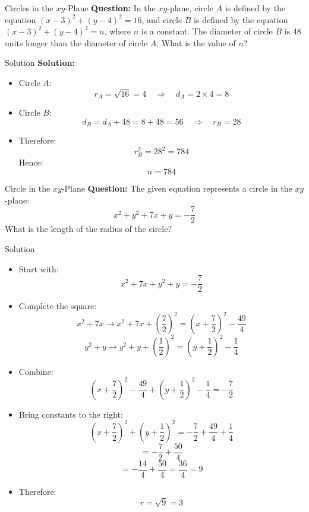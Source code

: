 \documentclass{beamer}
\begin{document}
\begin{frame}{Circles in the \(xy\)-Plane}
\textbf{Question:}  
In the \(xy\)-plane, circle \(A\) is defined by the equation \((x - 3)^2 + (y - 4)^2 = 16\), and circle \(B\) is defined by the equation \((x - 3)^2 + (y - 4)^2 = n\), where \(n\) is a constant. The diameter of circle \(B\) is 48 units longer than the diameter of circle \(A\). What is the value of \(n\)?
\end{frame}

\begin{frame}{Solution}
\textbf{Solution:}
\begin{itemize}
    \item Circle \(A\):
    \[
    r_A = \sqrt{16} = 4 \quad \Rightarrow \quad d_A = 2 \times 4 = 8
    \]
    \item Circle \(B\):
    \[
    d_B = d_A + 48 = 8 + 48 = 56 \quad \Rightarrow \quad r_B = 28
    \]
    \item Therefore:
    \[
    r_B^2 = 28^2 = 784
    \]
    Hence:
    \[
    \boxed{n = 784}
    \]
\end{itemize}
\end{frame}

\begin{frame}{Circle in the \(xy\)-Plane}
\textbf{Question:}  
The given equation represents a circle in the \(xy\)-plane:
\[
x^2 + y^2 + 7x + y = -\frac{7}{2}
\]
What is the length of the radius of the circle?
\end{frame}

\begin{frame}{Solution}
\scriptsize

\begin{itemize}
    \item Start with:
    \[
    x^2 + 7x + y^2 + y = -\frac{7}{2}
    \]
    \item Complete the square:
    \[
    x^2 + 7x \rightarrow x^2 + 7x + \left(\frac{7}{2}\right)^2 = \left(x + \frac{7}{2}\right)^2 - \frac{49}{4}
    \]
    \[
    y^2 + y \rightarrow y^2 + y + \left(\frac{1}{2}\right)^2 = \left(y + \frac{1}{2}\right)^2 - \frac{1}{4}
    \]
    \item Combine:
    \[
    \left(x + \frac{7}{2}\right)^2 - \frac{49}{4} + \left(y + \frac{1}{2}\right)^2 - \frac{1}{4} = -\frac{7}{2}
    \]
    \item Bring constants to the right:
    \[
    \left(x + \frac{7}{2}\right)^2 + \left(y + \frac{1}{2}\right)^2 = -\frac{7}{2} + \frac{49}{4} + \frac{1}{4}
    \]
    \[
    = -\frac{7}{2} + \frac{50}{4}
    \]
    \[
    = -\frac{14}{4} + \frac{50}{4} = \frac{36}{4} = 9
    \]
    \item Therefore:
    \[
    r = \sqrt{9} = \boxed{3}
    \]
\end{itemize}
\end{frame}
\end{document}
